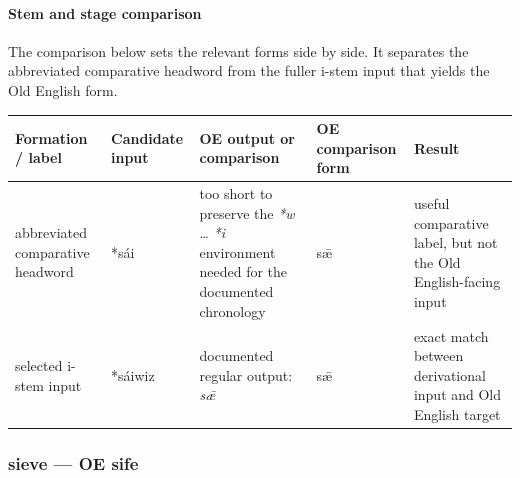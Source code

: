 \documentclass[
  british,
  a4paper,
]{article}
\newcounter{none} %
\begin{document}
\paragraph{Stem and stage comparison}\label{stem-and-stage-comparison}

The comparison below sets the relevant forms side by side. It separates
the abbreviated comparative headword from the fuller i-stem input that
yields the Old English form.

{\def\LTcaptype{none} %
\begin{longtable}[]{@{}
  >{\raggedright\arraybackslash}p{}
  >{\raggedright\arraybackslash}p{}
  >{\raggedright\arraybackslash}p{}
  >{\raggedright\arraybackslash}p{}
  >{\raggedright\arraybackslash}p{}@{}}
\toprule\noalign{}
\begin{minipage}[b]{\linewidth}\raggedright
Formation / label
\end{minipage} & \begin{minipage}[b]{\linewidth}\raggedright
Candidate input
\end{minipage} & \begin{minipage}[b]{\linewidth}\raggedright
OE output or comparison
\end{minipage} & \begin{minipage}[b]{\linewidth}\raggedright
OE comparison form
\end{minipage} & \begin{minipage}[b]{\linewidth}\raggedright
Result
\end{minipage} \\
\midrule\noalign{}
\endhead
\bottomrule\noalign{}
\endlastfoot
abbreviated comparative headword & *sái & too short to preserve the
\emph{*w} \ldots{} \emph{*i} environment needed for the documented
chronology & sǣ & useful comparative label, but not the Old
English-facing input \\
selected i-stem input & *sáiwiz & documented regular output: \emph{sǣ} &
sǣ & exact match between derivational input and Old English target \\
\end{longtable}
}

\subsubsection{sieve --- OE sife}\label{sieve-oe-sife}
\end{document}
